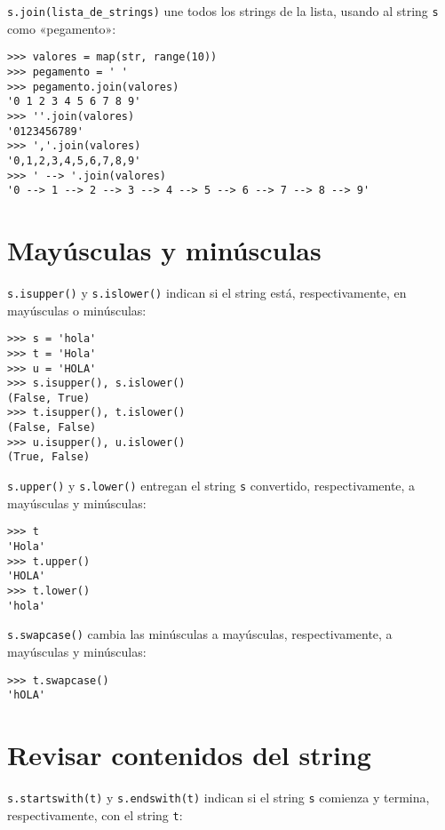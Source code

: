 \lstinline!s.join(lista_de_strings)! une todos los strings de la lista,
usando al string \lstinline!s! como «pegamento»:

\begin{lstlisting}
>>> valores = map(str, range(10))
>>> pegamento = ' '
>>> pegamento.join(valores)
'0 1 2 3 4 5 6 7 8 9'
>>> ''.join(valores)
'0123456789'
>>> ','.join(valores)
'0,1,2,3,4,5,6,7,8,9'
>>> ' --> '.join(valores)
'0 --> 1 --> 2 --> 3 --> 4 --> 5 --> 6 --> 7 --> 8 --> 9'
\end{lstlisting}

\section{Mayúsculas y minúsculas}

\lstinline!s.isupper()! y \lstinline!s.islower()! indican si el string
está, respectivamente, en mayúsculas o minúsculas:

\begin{lstlisting}
>>> s = 'hola'
>>> t = 'Hola'
>>> u = 'HOLA'
>>> s.isupper(), s.islower()
(False, True)
>>> t.isupper(), t.islower()
(False, False)
>>> u.isupper(), u.islower()
(True, False)
\end{lstlisting}

\lstinline!s.upper()! y \lstinline!s.lower()! entregan el string
\lstinline!s! convertido, respectivamente, a mayúsculas y minúsculas:

\begin{lstlisting}
>>> t
'Hola'
>>> t.upper()
'HOLA'
>>> t.lower()
'hola'
\end{lstlisting}

\lstinline!s.swapcase()! cambia las minúsculas a mayúsculas,
respectivamente, a mayúsculas y minúsculas:

\begin{lstlisting}
>>> t.swapcase()
'hOLA'
\end{lstlisting}

%
%
\section{Revisar contenidos del string}

\lstinline!s.startswith(t)! y \lstinline!s.endswith(t)! indican si el
string \lstinline!s! comienza y termina, respectivamente, con el string
\lstinline!t!:

